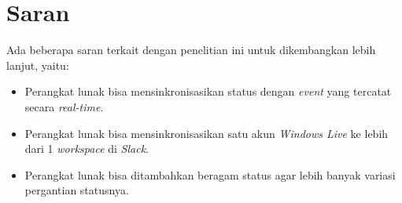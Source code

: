 \section{Saran}
Ada beberapa saran terkait dengan penelitian ini untuk dikembangkan lebih lanjut, yaitu:
\begin{itemize}
    \item Perangkat lunak bisa mensinkronisasikan status dengan \textit{event} yang tercatat secara \textit{real-time}. 
    \item Perangkat lunak bisa mensinkronisasikan satu akun \textit{Windows Live} ke lebih dari 1 \textit{workspace} di \textit{Slack}. 
    \item Perangkat lunak bisa ditambahkan beragam status agar lebih banyak variasi pergantian statusnya. 
\end{itemize}